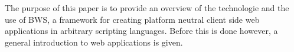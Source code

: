 The purpose of this paper is to provide an overview of the technologie and the use of BWS, a framework for creating platform neutral client side web applications in arbitrary scripting languages. Before this is done however, a general introduction to web applications is given.